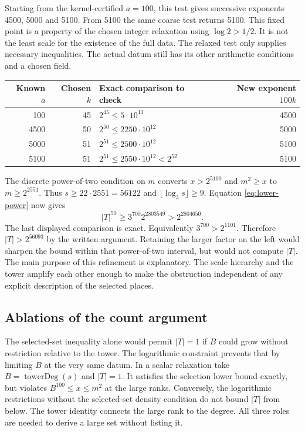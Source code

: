 \documentclass[12pt,letterpaper]{article}
\begin{document}
Starting from the kernel-certified $a=100$, this test gives successive exponents 4500, 5000 and 5100. From 5100 the same coarse test returns 5100. This fixed point is a property of the chosen integer relaxation using $\log2>1/2$. It is not the least scale for the existence of the full data. The relaxed test only supplies necessary inequalities. The actual datum still has its other arithmetic conditions and a chosen field.

\begin{center}
\small
\begin{tabular}{@{}r r l r@{}}\toprule
Known $a$ & Chosen $k$ & Exact comparison to check & New exponent $100k$\\\midrule
100 & 45 & $2^{45}\le 5\cdot10^{13}$ & 4500\\
4500 & 50 & $2^{50}\le 2250\cdot10^{12}$ & 5000\\
5000 & 51 & $2^{51}\le 2500\cdot10^{12}$ & 5100\\
5100 & 51 & $2^{51}\le 2550\cdot10^{12}<2^{52}$ & 5100\\\bottomrule
\end{tabular}
\end{center}

The discrete power-of-two condition on $m$ converts $x>2^{5100}$ and $m^2\ge x$ to $m\ge2^{2551}$. Thus $s\ge22\cdot2551=56122$ and $\lfloor\log_3s\rfloor\ge9$. Equation \eqref{eq:lower-power} now gives
\[
                    |T|^{50}\ge 3^{700}2^{2803549}>2^{2804650}.
\]
The last displayed comparison is exact. Equivalently $3^{700}>2^{1101}$. Therefore $|T|>2^{56093}$ by the written argument. Retaining the larger factor on the left would sharpen the bound within that power-of-two interval, but would not compute $|T|$. The main purpose of this refinement is explanatory. The scale hierarchy and the tower amplify each other enough to make the obstruction independent of any explicit description of the selected places.

\subsection{Ablations of the count argument}
The selected-set inequality alone would permit $|T|=1$ if $B$ could grow without restriction relative to the tower. The logarithmic constraint prevents that by limiting $B$ at the very same datum. In a scalar relaxation take $B=\operatorname{towerDeg}(s)$ and $|T|=1$. It satisfies the selection lower bound exactly, but violates $B^{100}\le x\le m^2$ at the large ranks. Conversely, the logarithmic restrictions without the selected-set density condition do not bound $|T|$ from below. The tower identity connects the large rank to the degree. All three roles are needed to derive a large set without listing it.
\end{document}
